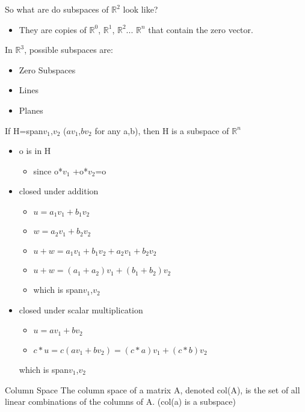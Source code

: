 So what are do subspaces of $\mathbb{R}^2$ look like?
\begin{itemize}
    \item They are copies of $\mathbb{R}^0$, $\mathbb{R}^1$, $\mathbb{R}^2$... $\mathbb{R}^n$ that contain the zero vector.
\end{itemize}
\begin{ex}
In $\mathbb{R}^3$, possible subspaces are:
\begin{itemize}
    \item Zero Subspaces
    \item Lines
    \item Planes
\end{itemize}
\end{ex}
\begin{ex}
If H=span{$v_1$,$v_2$} ({$av_1$,$bv_2$} for any a,b), then H is a subspace of $\mathbb{R}^n$
\begin{itemize}
\item o is in H \checkmark
\begin{itemize}
    \item since o*$v_1$ +o*$v_2$=o
\end{itemize}
\item closed under addition \checkmark
\begin{itemize}
    \item $u=a_1v_1+b_1v_2$
    \item $w=a_2v_1+b_2v_2$
    \item $u+w=a_1v_1+b_1v_2+a_2v_1+b_2v_2$
    \item $u+w=(a_1+a_2)v_1+(b_1+b_2)v_2$
    \item which is span{$v_1$,$v_2$}
\end{itemize}
\item closed under scalar multiplication
\begin{itemize}
    \item $u=av_1+bv_2$
    \item $c*u=c(av_1+bv_2)=(c*a)v_1+(c*b)v_2$
\end{itemize}
which is span{$v_1$,$v_2$}
\end{itemize}
\end{ex}
\begin{imp:defn}{Column Space}{} The column space of a matrix A, denoted col(A), is the set of all linear combinations of the columns of A. (col(a) is a subspace)
\end{imp:defn}
